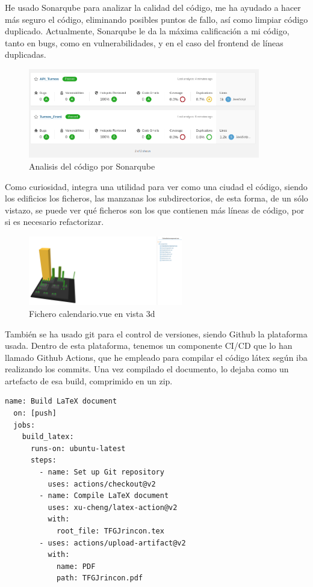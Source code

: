 \documentclass[11pt,spanish,listoffigures,listoftables]{tfgetsinf}
\begin{document}
He usado Sonarqube para analizar la calidad del código, me ha ayudado a hacer más seguro el código, eliminando posibles puntos de fallo, así como limpiar código duplicado.
Actualmente, Sonarqube le da la máxima calificación a mi código, tanto en bugs, como en vulnerabilidades, y en el caso del frontend de líneas duplicadas.
\begin{figure}[h!] %
  \centering
   \includegraphics[width=0.90\textwidth]{img/estadosonar.png}
   \caption{Analisis del código por Sonarqube}
   \label{fig:estadosonar}
 \end{figure}
Como curiosidad, integra una utilidad para ver como una ciudad el código, siendo los edificios los ficheros, las manzanas los subdirectorios, de esta forma, de un sólo vistazo, se puede ver qué ficheros son los que contienen más líneas de código, por si es necesario refactorizar.
\begin{figure}[h!] %
  \centering
   \includegraphics[width=0.60\textwidth]{img/calendarioSonarqube.png}
   \caption{Fichero calendario.vue en vista 3d}
   \label{fig:calendariosonar}
 \end{figure}
También se ha usado git para el control de versiones, siendo Github la plataforma usada. Dentro de esta plataforma, tenemos un componente CI/CD que lo han llamado Github Actions, que he empleado para compilar el código látex según iba realizando los commits.
Una vez compilado el documento, lo dejaba como un artefacto de esa build, comprimido en un zip. 
\begin{lstlisting}[style=ES6, caption={Configuración action github}]
  name: Build LaTeX document
  on: [push]
  jobs:
    build_latex:
      runs-on: ubuntu-latest
      steps:
        - name: Set up Git repository
          uses: actions/checkout@v2
        - name: Compile LaTeX document
          uses: xu-cheng/latex-action@v2
          with:
            root_file: TFGJrincon.tex
        - uses: actions/upload-artifact@v2
          with:
            name: PDF
            path: TFGJrincon.pdf
\end{lstlisting}
\end{document}
